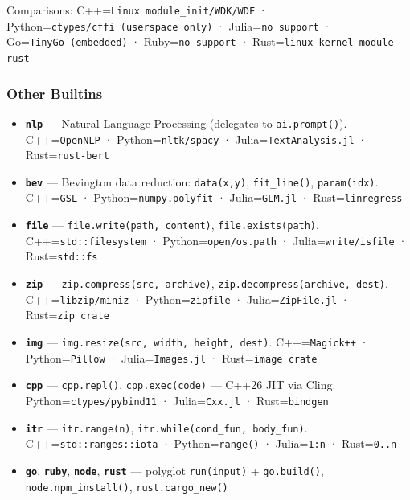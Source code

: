 \documentclass[
]{article}
\providecommand{\tightlist}{%
  \setlength{\itemsep}{0pt}\setlength{\parskip}{0pt}}
\begin{document}
Comparisons: C++=\texttt{Linux\ module\_init/WDK/WDF} ·
Python=\texttt{ctypes/cffi\ (userspace\ only)} ·
Julia=\texttt{no\ support} · Go=\texttt{TinyGo\ (embedded)} ·
Ruby=\texttt{no\ support} · Rust=\texttt{linux-kernel-module-rust}

\subsubsection{Other Builtins}\label{other-builtins}

\begin{itemize}
\tightlist
\item
  \textbf{\texttt{nlp}} --- Natural Language Processing (delegates to
  \texttt{ai.prompt()}). C++=\texttt{OpenNLP} ·
  Python=\texttt{nltk/spacy} · Julia=\texttt{TextAnalysis.jl} ·
  Rust=\texttt{rust-bert}
\item
  \textbf{\texttt{bev}} --- Bevington data reduction:
  \texttt{data(x,y)}, \texttt{fit\_line()}, \texttt{param(idx)}.
  C++=\texttt{GSL} · Python=\texttt{numpy.polyfit} ·
  Julia=\texttt{GLM.jl} · Rust=\texttt{linregress}
\item
  \textbf{\texttt{file}} --- \texttt{file.write(path,\ content)},
  \texttt{file.exists(path)}. C++=\texttt{std::filesystem} ·
  Python=\texttt{open/os.path} · Julia=\texttt{write/isfile} ·
  Rust=\texttt{std::fs}
\item
  \textbf{\texttt{zip}} --- \texttt{zip.compress(src,\ archive)},
  \texttt{zip.decompress(archive,\ dest)}. C++=\texttt{libzip/miniz} ·
  Python=\texttt{zipfile} · Julia=\texttt{ZipFile.jl} ·
  Rust=\texttt{zip\ crate}
\item
  \textbf{\texttt{img}} ---
  \texttt{img.resize(src,\ width,\ height,\ dest)}.
  C++=\texttt{Magick++} · Python=\texttt{Pillow} ·
  Julia=\texttt{Images.jl} · Rust=\texttt{image\ crate}
\item
  \textbf{\texttt{cpp}} --- \texttt{cpp.repl()}, \texttt{cpp.exec(code)}
  --- C++26 JIT via Cling. Python=\texttt{ctypes/pybind11} ·
  Julia=\texttt{Cxx.jl} · Rust=\texttt{bindgen}
\item
  \textbf{\texttt{itr}} --- \texttt{itr.range(n)},
  \texttt{itr.while(cond\_fun,\ body\_fun)}.
  C++=\texttt{std::ranges::iota} · Python=\texttt{range()} ·
  Julia=\texttt{1:n} · Rust=\texttt{0..n}
\item
  \textbf{\texttt{go}}, \textbf{\texttt{ruby}}, \textbf{\texttt{node}},
  \textbf{\texttt{rust}} --- polyglot \texttt{run(input)} +
  \texttt{go.build()}, \texttt{node.npm\_install()},
  \texttt{rust.cargo\_new()}

\end{itemize}
\end{document}
